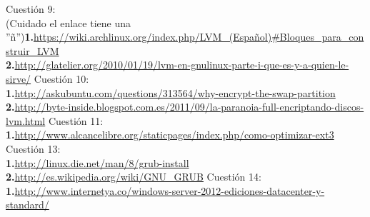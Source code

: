 \documentclass[a4paper, 11pt]{article} %
\begin{document}
\begin{thebibliography}{X}
 Cuestión 9:\\
	(Cuidado el enlace tiene una ''ñ'')\textbf{1.}\url{https://wiki.archlinux.org/index.php/LVM_(Español)#Bloques_para_construir_LVM}\\
	\textbf{2.}\url{http://glatelier.org/2010/01/19/lvm-en-gnulinux-parte-i-que-es-y-a-quien-le-sirve/}
 Cuestión 10:\\
	\textbf{1.}\url{http://askubuntu.com/questions/313564/why-encrypt-the-swap-partition}\\
	\textbf{2.}\url{http://byte-inside.blogspot.com.es/2011/09/la-paranoia-full-encriptando-discos-lvm.html}
 Cuestión 11:\\
	\textbf{1.}\url{http://www.alcancelibre.org/staticpages/index.php/como-optimizar-ext3}
 Cuestión 13:\\
	\textbf{1.}\url{http://linux.die.net/man/8/grub-install}\\
	\textbf{2.}\url{http://es.wikipedia.org/wiki/GNU_GRUB}
 Cuestión 14:\\
	\textbf{1.}\url{http://www.internetya.co/windows-server-2012-ediciones-datacenter-y-standard/}
\end{thebibliography}
\end{document}
